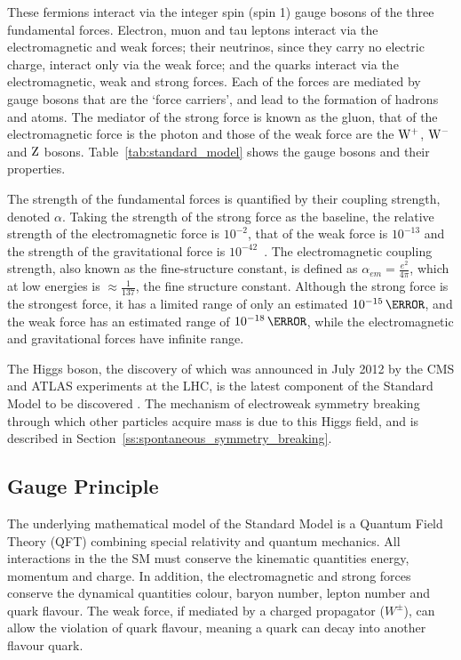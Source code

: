 These fermions interact via the integer spin (spin 1) gauge bosons of the three fundamental forces. Electron,
muon and tau leptons interact via the electromagnetic and weak forces; their neutrinos, since they carry no
electric charge, interact only via the weak force; and the quarks interact via the electromagnetic, weak and
strong forces. Each of the forces are mediated by gauge bosons that are the `force carriers', and lead to the
formation of hadrons and atoms. The mediator of the strong force is known as the gluon, that of the
electromagnetic force is the photon and those of the weak force are the $\mathrm{W}^{+}$, $\mathrm{W}^{-}$ and $\mathrm{Z}$ bosons.
Table~\ref{tab:standard_model} shows the gauge bosons and their properties.

The strength of the fundamental forces is quantified by their coupling strength, denoted $\alpha$. Taking the
strength of the strong force as the baseline, the relative strength of the electromagnetic force is $10^{-2}$,
that of the weak force is $10^{-13}$ and the strength of the gravitational force is
$10^{-42}$~\cite{Griffiths:1987tj}. The electromagnetic coupling strength, also known as the fine-structure
constant, is defined as $\alpha_{em}=\frac{e^{2}}{4\pi}$, which at low energies is $\approx\frac{1}{137}$,
the fine structure constant.
Although the strong force is the strongest force, it has a limited range of only an estimated $10^{-15}\m$,
and the weak force has an estimated range of $10^{-18}\m$, while the electromagnetic and gravitational forces
have infinite range.

The Higgs boson, the discovery of which was announced in July 2012 by the CMS and ATLAS experiments at the
LHC, is the latest component of the Standard Model to be discovered \cite{Chatrchyan:2012xdj, Aad:2012tfa}.
The mechanism of electroweak symmetry breaking through which other particles acquire mass is due to this Higgs
field, and is described in Section~\ref{ss:spontaneous_symmetry_breaking}.

\subsection{Gauge Principle}
\label{ss:gauge_principle}
The underlying mathematical model of the Standard Model is a Quantum Field Theory (QFT) combining special
relativity and quantum mechanics. All interactions in the the SM must conserve the kinematic quantities
energy, momentum and charge. In addition, the electromagnetic and strong forces conserve the dynamical
quantities colour, baryon number, lepton number and quark flavour. The weak force, if mediated by a charged
propagator ($W^{\pm}$), can allow the violation of quark flavour, meaning a quark can decay into another
flavour quark.

